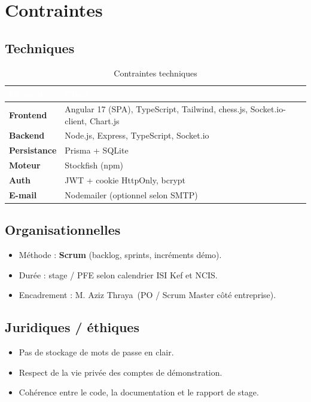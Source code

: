 \documentclass[12pt,a4paper,oneside]{article}
\newcommand{\SupervisorName}{M. Aziz Thraya}
\begin{document}
\section{Contraintes}

\subsection{Techniques}
\begin{table}[H]
\centering
\caption{Contraintes techniques}
\begin{tabularx}{\linewidth}{|>{\bfseries}l|X|}
\hline
\rowcolor{sectionblue}
\textcolor{white}{Élément} & \textcolor{white}{\textbf{Choix}} \\
\hline
Frontend & Angular 17 (SPA), TypeScript, Tailwind, chess.js, Socket.io-client, Chart.js \\
\hline
Backend & Node.js, Express, TypeScript, Socket.io \\
\hline
Persistance & Prisma + SQLite \\
\hline
Moteur & Stockfish (npm) \\
\hline
Auth & JWT + cookie HttpOnly, bcrypt \\
\hline
E-mail & Nodemailer (optionnel selon SMTP) \\
\hline
\end{tabularx}
\end{table}

\subsection{Organisationnelles}
\begin{itemize}
  \item Méthode : \textbf{Scrum} (backlog, sprints, incréments démo).
  \item Durée : stage / PFE selon calendrier ISI Kef et NCIS.
  \item Encadrement : \SupervisorName\ (PO / Scrum Master côté entreprise).
\end{itemize}

\subsection{Juridiques / éthiques}
\begin{itemize}
  \item Pas de stockage de mots de passe en clair.
  \item Respect de la vie privée des comptes de démonstration.
  \item Cohérence entre le code, la documentation et le rapport de stage.
\end{itemize}
\end{document}
